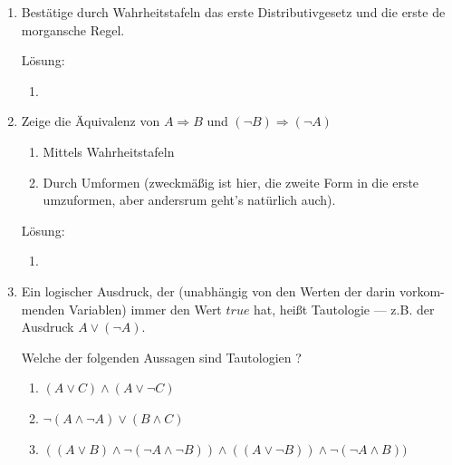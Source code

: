 \documentclass[../main.tex]{subfiles}
\begin{document}
\begin{enumerate}
	\item Bestätige durch Wahrheitstafeln das erste Distributivgesetz und die erste de morgansche Regel.

	      Lösung:
	      \begin{enumerate}
		      \item
	      \end{enumerate}
	\item Zeige die Äquivalenz von \(
	      A \Rightarrow B
	      \) und \(
	      (\neg B) \Rightarrow (\neg A)
	      \)
	      \begin{enumerate}
		      \item Mittels Wahrheitstafeln
		      \item Durch Umformen (zweckmäßig ist hier, die zweite Form in die erste umzuformen,
		            aber andersrum geht’s natürlich auch).
	      \end{enumerate}

	      Lösung:
	      \begin{enumerate}
		      \item
	      \end{enumerate}
	\item Ein logischer Ausdruck, der (unabhängig von den Werten der darin vorkom- menden Variablen)
	      immer den Wert \(
	      true
	      \) hat, heißt Tautologie — z.B. der Ausdruck \(
	      A \lor (\neg A)
	      \).

	      Welche der folgenden Aussagen sind Tautologien ?
	      \begin{enumerate}
		      \item \(
		            (A \lor C) \land (A \lor \neg C)
		            \)
		      \item \(
		            \neg (A \land \neg A) \lor (B \land C)
		            \)
		      \item \(
		            ((A \lor B) \land \neg (\neg A \land \neg B)) \land
		            ((A \lor \neg B)) \land \neg (\neg A \land B))
		            \)
	      \end{enumerate}


\end{enumerate}
\end{document}
